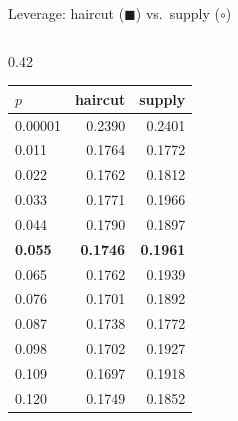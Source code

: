 \documentclass[aspectratio=169,10pt]{beamer}
\begin{document}
\begin{frame}{Leverage: haircut ($\blacksquare$) vs.\ supply ($\circ$)}
\begin{columns}[T]
\begin{column}{0.42\textwidth}
\begin{tabular}{lrr}
        \toprule
        $p$ & haircut & supply \\
        \midrule
        0.00001 & 0.2390 & 0.2401 \\
        0.011 & 0.1764 & 0.1772 \\
        0.022 & 0.1762 & 0.1812 \\
        0.033 & 0.1771 & 0.1966 \\
        0.044 & 0.1790 & 0.1897 \\
        \textbf{0.055} & \textbf{0.1746} & \textbf{0.1961} \\
        0.065 & 0.1762 & 0.1939 \\
        0.076 & 0.1701 & 0.1892 \\
        0.087 & 0.1738 & 0.1772 \\
        0.098 & 0.1702 & 0.1927 \\
        0.109 & 0.1697 & 0.1918 \\
        0.120 & 0.1749 & 0.1852 \\
        \bottomrule
      \end{tabular}
    \end{column}
  \end{columns}
\end{frame}
\end{document}
